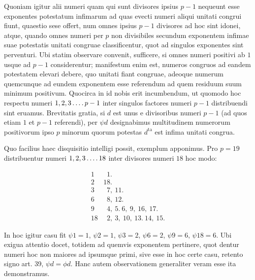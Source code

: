 Quoniam igitur alii numeri quam qui sunt divisores ipsius $p-1$ nequeunt esse exponentes potestatum infimarum ad quas evecti numeri aliqui unitati congrui fiunt, quaestio sese offert, num omnes ipsius $p-1$ divisores ad hoc sint idonei, atque, quando omnes numeri per $p$ non divisibiles secundum exponentem infimae suae potestatis unitati congruae classificentur, quot ad singulos exponentes sint perventuri. Ubi statim observare convenit, sufficere, si omnes numeri
positivi ab $1$ usque ad $p-1$ considerentur; manifestum enim est, numeros congruos ad eandem potestatem elevari debere, quo unitati fiant congruae, adeoque numerum quemcunque ad eundem exponentem esse referendum ad quem residuum suum minimum positivum. Quocirca in id nobis erit incumbendum, ut quomodo hoc respectu numeri $1,2,3\mathinner{\ldotp\ldotp\ldotp\ldotp} p-1$ inter singulos factores numeri $p-1$ distribuendi sint eruamus. Brevitatis gratia, si $d$ est unus e divisoribus numeri $p-1$ (ad quos etiam $1$ et $p-1$ referendi), per $\psi d$ designabimus multitudinem numerorum positivorum ipso $p$ minorum quorum potestas $d^{\mathrm{ta}}$ est infima unitati congrua.


Quo facilius haec disquisitio intelligi possit, exemplum apponimus. Pro $p=19$ distribuentur numeri $1,2,3\mathinner{\ldotp\ldotp\ldotp\ldotp}18$ inter divisores numeri $18$ hoc modo:

\[
\begin{array}{r|l}
1 & \phantom{1}1.\\
2 & 18.\\
3 & \phantom{1}7,\ 11.\\
6 & \phantom{1}8,\ 12.\\
9 & \phantom{1}4,\ 5.\ 6,\ 9,\ 16,\ 17.\\
18 & \phantom{1}2,\ 3,\ 10,\ 13.\ 14,\ 15.
\end{array}
\]

In hoc igitur casu fit $\psi1=1$, $\psi2=1$, $\psi3=2$, $\psi6=2$, $\psi9=6$, $\psi18=6$. Ubi exigua attentio docet, totidem ad quemvis exponentem pertinere, quot dentur numeri hoc non maiores ad ipsumque primi, sive esse in hoc certe casu, retento signo art. 39, $\psi d=\phi d$. Hanc autem observationem generaliter veram esse ita demonstramus.

